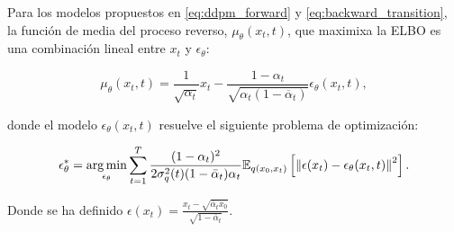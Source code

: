 \begin{prop}
    \label{prop:epsilon_prediction}

    Para los modelos propuestos en \eqref{eq:ddpm_forward} y \eqref{eq:backward_transition}, la función de media del proceso reverso, $\mu_\theta(x_t,t)$, que maximixa la ELBO es una combinación lineal entre $x_t$ y $\epsilon_\theta$:

    \begin{equation}
        \label{eq:ddpm_epsilon_prediction}
        \mu_\theta(x_t,t) = \frac{1}{\sqrt{\alpha_t}}x_t - \frac{1-\alpha_t}{\sqrt{\alpha_t(1-\overline{\alpha}_t)}}\epsilon_\theta(x_t,t),
    \end{equation}

    donde el modelo $\epsilon_\theta(x_t,t)$ resuelve el siguiente problema de optimización:

    \begin{equation*}
        \epsilon_\theta^*=\operatorname*{arg\,min}_{\epsilon_\theta} \sum_{t=1}^T \frac{(1-\alpha_t)^2}{2\sigma_q^2(t)(1-\bar\alpha_t)\alpha_t} \mathbb{E}_{q(x_0,x_t)}\left[ \left\lVert \epsilon(x_t) - \epsilon_\theta(x_t,t) \right\rVert^2\right].
    \end{equation*}

    Donde se ha definido $\epsilon(x_t) = \frac{x_t-\sqrt{\overline{\alpha}_t x_0}}{\sqrt{1-\overline{\alpha}_t}}$.
\end{prop}

